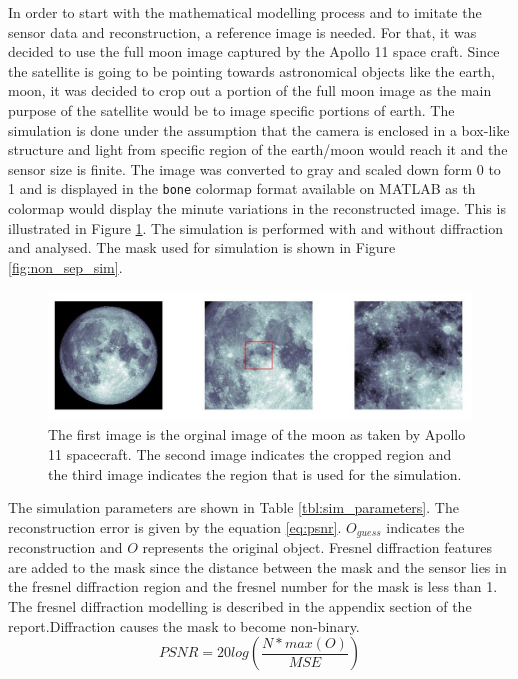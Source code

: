 In order to start with the mathematical modelling process and to imitate the sensor data and reconstruction, a reference image is needed. For that, it was decided to use the full moon image captured by the Apollo 11 space craft\cite{MoonImage}. Since the satellite is going to be pointing towards astronomical objects like the earth, moon, it was decided to crop out a portion of the full moon image as the main purpose of the satellite would be to image specific portions of earth. The simulation is done under the assumption that the camera is enclosed in a box-like structure and light from specific region of the earth/moon would reach it and the sensor size is finite. The image was converted to gray and scaled down form 0 to 1 and is displayed in the \texttt{bone} colormap format available on MATLAB as th colormap would display the minute variations in the reconstructed image. This is illustrated in Figure \ref{fig:moon_image}. The simulation is performed with and without diffraction and analysed. The mask used for simulation is shown in Figure \ref{fig:non_sep_sim}.
\begin{figure}[ht]
\includegraphics[scale = 0.50]{pics/MoonImagePortion}
\caption{The first image is the orginal image of the moon as taken by Apollo 11 spacecraft. The second image indicates the cropped region and the third image indicates the region that is used for the simulation.}
\label{fig:moon_image}
\end{figure}
The simulation parameters are shown in Table \ref{tbl:sim_parameters}. The reconstruction error is given by the equation \ref{eq:psnr}. $O_{guess}$ indicates the reconstruction and $O$ represents the original object. Fresnel diffraction features are added to the mask since the distance between the mask and the sensor lies in the fresnel diffraction region and the fresnel number for the mask is less than  1. The fresnel diffraction modelling is described in the appendix section of the report.Diffraction causes the mask to become non-binary.
\begin{equation}
PSNR = 20log(\frac{N*max(O)}{MSE})
\label{eq:psnr}
\end{equation}

